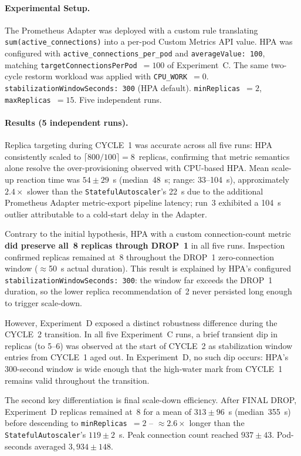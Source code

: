 \documentclass[twocolumn]{svjour3}
\begin{document}
\paragraph{Experimental Setup.} The Prometheus Adapter was deployed with a custom rule
translating \texttt{sum(active\_connections)} into a per-pod Custom Metrics API value. HPA
was configured with \texttt{active\_connections\_per\_pod} and \texttt{averageValue: 100},
matching \texttt{targetConnectionsPerPod}~$= 100$ of Experiment~C. The same two-cycle
restorm workload was applied with \texttt{CPU\_WORK}~$= 0$.
\texttt{stabilizationWindowSeconds: 300} (HPA default). \texttt{minReplicas}~$= 2$,
\texttt{maxReplicas}~$= 15$. Five independent runs.

\paragraph{Results (5 independent runs).} Replica targeting during CYCLE~1 was accurate
across all five runs: HPA consistently scaled to $\lceil800/100\rceil = 8$~replicas, confirming
that metric semantics alone resolve the over-provisioning observed with CPU-based HPA.
Mean scale-up reaction time was $54 \pm 29$~s (median~48~s; range: 33--104~s),
approximately $2.4\times$ slower than the \texttt{StatefulAutoscaler}'s 22~s due to the
additional Prometheus Adapter metric-export pipeline latency; run~3 exhibited a 104~s
outlier attributable to a cold-start delay in the Adapter.

Contrary to the initial hypothesis, HPA with a custom connection-count metric \textbf{did
preserve all~8 replicas through DROP~1} in all five runs. Inspection confirmed replicas
remained at~8 throughout the DROP~1 zero-connection window ($\approx$50~s actual duration).
This result is explained by HPA's configured \texttt{stabilizationWindowSeconds: 300}: the
window far exceeds the DROP~1 duration, so the lower replica recommendation of~2 never
persisted long enough to trigger scale-down.

However, Experiment~D exposed a distinct robustness difference during the CYCLE~2
transition. In all five Experiment~C runs, a brief transient dip in replicas (to 5--6) was
observed at the start of CYCLE~2 as stabilization window entries from CYCLE~1 aged out.
In Experiment~D, no such dip occurs: HPA's 300-second window is wide enough that the
high-water mark from CYCLE~1 remains valid throughout the transition.

The second key differentiation is final scale-down efficiency. After FINAL DROP, Experiment~D
replicas remained at~8 for a mean of $313 \pm 96$~s (median~355~s) before descending to
\texttt{minReplicas}~$= 2$ -- $\approx 2.6\times$ longer than the \texttt{StatefulAutoscaler}'s
$119 \pm 2$~s. Peak connection count reached $937 \pm 43$. Pod-seconds averaged
$3{,}934 \pm 148$.
\end{document}
